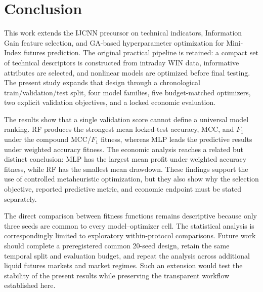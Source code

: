 \section{Conclusion}\label{sec:conclusion}

This work extends the IJCNN precursor on technical indicators, Information Gain feature selection, and GA-based hyperparameter optimization for Mini-Index futures prediction. The original practical pipeline is retained: a compact set of technical descriptors is constructed from intraday WIN data, informative attributes are selected, and nonlinear models are optimized before final testing. The present study expands that design through a chronological train/validation/test split, four model families, five budget-matched optimizers, two explicit validation objectives, and a locked economic evaluation.

The results show that a single validation score cannot define a universal model ranking. RF produces the strongest mean locked-test accuracy, MCC, and $F_1$ under the compound MCC/$F_1$ fitness, whereas MLP leads the predictive results under weighted accuracy fitness. The economic analysis reaches a related but distinct conclusion: MLP has the largest mean profit under weighted accuracy fitness, while RF has the smallest mean drawdown. These findings support the use of controlled metaheuristic optimization, but they also show why the selection objective, reported predictive metric, and economic endpoint must be stated separately.

The direct comparison between fitness functions remains descriptive because only three seeds are common to every model--optimizer cell. The statistical analysis is correspondingly limited to exploratory within-protocol comparisons. Future work should complete a preregistered common 20-seed design, retain the same temporal split and evaluation budget, and repeat the analysis across additional liquid futures markets and market regimes. Such an extension would test the stability of the present results while preserving the transparent workflow established here.
